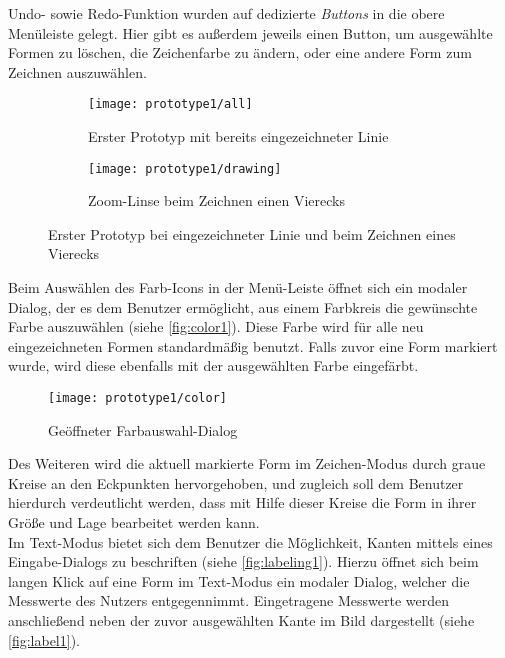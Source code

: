 Undo- sowie Redo-Funktion wurden auf dedizierte \emph{Buttons} in die obere Menüleiste gelegt.
Hier gibt es außerdem jeweils einen Button, um ausgewählte Formen zu löschen, die Zeichenfarbe zu ändern, oder eine andere Form zum Zeichnen auszuwählen. \\

\begin{figure}[h]
  \begin{subfigure}[t]{0.4\textwidth}
    \texttt{[image: prototype1/all]}
    \caption{Erster Prototyp mit bereits eingezeichneter Linie}
    \label{fig:all1}
  \end{subfigure}
  \begin{subfigure}[t]{0.4\textwidth}
    \texttt{[image: prototype1/drawing]}
    \caption{Zoom-Linse beim Zeichnen einen Vierecks}
    \label{fig:draw1}
  \end{subfigure}
  \centering
  \caption{Erster Prototyp bei eingezeichneter Linie und beim Zeichnen eines Vierecks}
\end{figure}

\noindent
Beim Auswählen des Farb-Icons in der Menü-Leiste öffnet sich ein modaler Dialog, der es dem Benutzer ermöglicht, aus einem Farbkreis die gewünschte Farbe auszuwählen (siehe \autoref{fig:color1}).
Diese Farbe wird für alle neu eingezeichneten Formen standardmäßig benutzt.
Falls zuvor eine Form markiert wurde, wird diese ebenfalls mit der ausgewählten Farbe eingefärbt. \\

\begin{wrapfigure}{R}{0.5\textwidth}
  \centering
  \texttt{[image: prototype1/color]}
  \caption{Geöffneter Farbauswahl-Dialog}
  \label{fig:color1}
\end{wrapfigure}

Des Weiteren wird die aktuell markierte Form im Zeichen-Modus durch graue Kreise an den Eckpunkten hervorgehoben, und zugleich soll dem Benutzer hierdurch verdeutlicht werden, dass mit Hilfe dieser Kreise die Form in ihrer Größe und Lage bearbeitet werden kann. \\

Im Text-Modus bietet sich dem Benutzer die Möglichkeit, Kanten mittels eines Eingabe-Dialogs zu beschriften (siehe \autoref{fig:labeling1}).
Hierzu öffnet sich beim langen Klick auf eine Form im Text-Modus ein modaler Dialog, welcher die Messwerte des Nutzers entgegennimmt.
Eingetragene Messwerte werden anschließend neben der zuvor ausgewählten Kante im Bild dargestellt (siehe \autoref{fig:label1}). 

